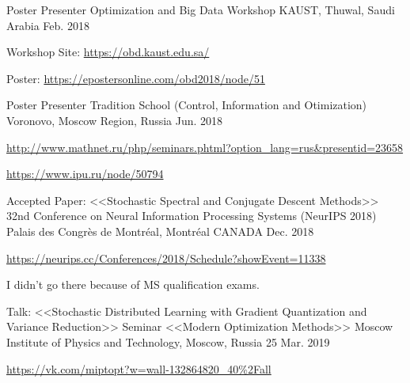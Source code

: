 


\begin{cventries}


\cventry
{Poster Presenter} %
{Optimization and Big Data Workshop} %
{KAUST, Thuwal, Saudi Arabia} %
{Feb. 2018} %
{ %
	\begin{cvitems}
		\item {Workshop Site: \url{https://obd.kaust.edu.sa/}}
		\item {Poster: \url{ https://epostersonline.com/obd2018/node/51}}
	\end{cvitems}
}

\cventry
{Poster Presenter} %
{Tradition School (Control, Information and Otimization)} %
{Voronovo, Moscow Region, Russia} %
{Jun. 2018} %
{ %
	\begin{cvitems}
		\item {\url{http://www.mathnet.ru/php/seminars.phtml?option_lang=rus&presentid=23658}}
		\item {\url{https://www.ipu.ru/node/50794}}
	\end{cvitems}
}

\cventry
{Accepted Paper: <<Stochastic Spectral and Conjugate Descent Methods>>} %
{32nd Conference on Neural Information Processing Systems (NeurIPS 2018)} %
{Palais des Congrès de Montréal, Montréal CANADA} %
{Dec. 2018} %
{ %
	\begin{cvitems}
		\item {\url{https://neurips.cc/Conferences/2018/Schedule?showEvent=11338}}
		\item {I didn't go there because of MS qualification exams.}
	\end{cvitems}
}

\cventry
{Talk: <<Stochastic Distributed Learning with Gradient Quantization and Variance Reduction>>}
{Seminar <<Modern Optimization Methods>>}
{Moscow Institute of Physics and Technology, Moscow, Russia}
{25 Mar. 2019}
{
\begin{cvitems}
	\item {\url{https://vk.com/miptopt?w=wall-132864820_40\%2Fall}}
\end{cvitems}
}


\end{cventries}
